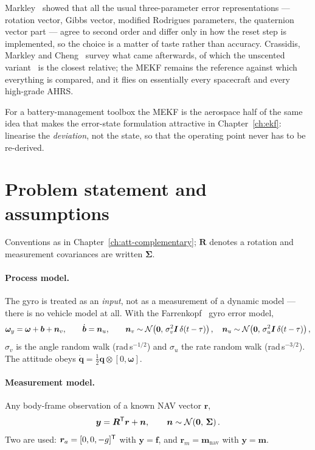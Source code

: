 Markley~\cite{markley2003mekf} showed that all the usual three-parameter error representations ---
rotation vector, Gibbs vector, modified Rodrigues parameters, the quaternion vector part --- agree
to second order and differ only in how the reset step is implemented, so the choice is a matter of
taste rather than accuracy. Crassidis, Markley and Cheng~\cite{crassidis2007survey} survey what came
afterwards, of which the unscented variant~\cite{crassidismarkley2003} is the closest relative;
the MEKF remains the reference against which everything is compared, and it flies on
essentially every spacecraft and every high-grade AHRS.

For a battery-management toolbox the MEKF is the aerospace half of the same idea that makes the
error-state formulation attractive in Chapter~\ref{ch:ekf}: linearise the \emph{deviation}, not the
state, so that the operating point never has to be re-derived.

\section{Problem statement and assumptions}
Conventions as in Chapter~\ref{ch:att-complementary}; $\bm{R}$ denotes a rotation and measurement
covariances are written $\bm{\Sigma}$.

\paragraph{Process model.} The gyro is treated as an \emph{input}, not as a measurement of a
dynamic model --- there is no vehicle model at all. With the Farrenkopf~\cite{farrenkopf1978} gyro
error model,
\begin{equation}
\bm{\omega}_y = \bm{\omega} + \bm{b} + \bm{n}_v,\qquad
\dot{\bm{b}} = \bm{n}_u,\qquad
\bm{n}_v\sim\mathcal{N}\!\left(\bm{0},\,\sigma_v^2\bm{I}\,\delta(t-\tau)\right),\quad
\bm{n}_u\sim\mathcal{N}\!\left(\bm{0},\,\sigma_u^2\bm{I}\,\delta(t-\tau)\right) ,
\label{eq:mekf-gyro}
\end{equation}
$\sigma_v$ is the angle random walk (rad\,s$^{-1/2}$) and $\sigma_u$ the rate random walk
(rad\,s$^{-3/2}$). The attitude obeys $\dot{\bm{q}}=\tfrac12\bm{q}\otimes[0,\bm{\omega}]$.

\paragraph{Measurement model.} Any body-frame observation of a known NAV vector $\bm{r}$,
\begin{equation}
\bm{y} = \bm{R}^{\mathsf{T}}\bm{r} + \bm{n},\qquad \bm{n}\sim\mathcal{N}\!\left(\bm{0},\,\bm{\Sigma}\right) .
\label{eq:mekf-meas}
\end{equation}
Two are used: $\bm{r}_a=[0,0,-g]^{\mathsf{T}}$ with $\bm{y}=\bm{f}$, and $\bm{r}_m=\bm{m}_{\text{nav}}$ with
$\bm{y}=\bm{m}$.

